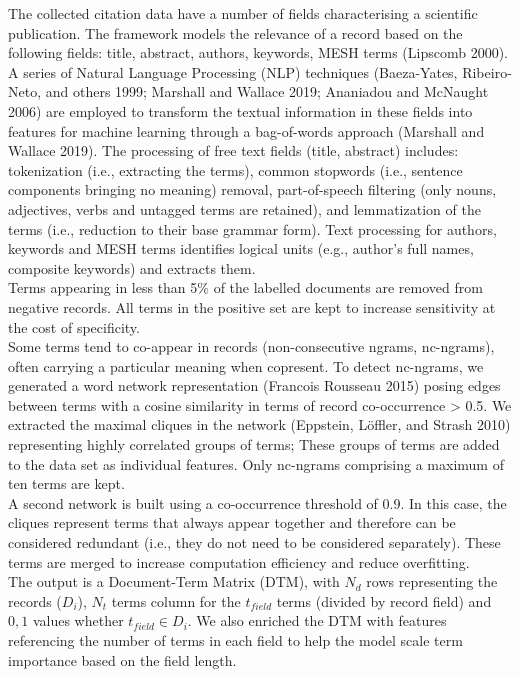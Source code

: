 \documentclass{article}
\begin{document}
The collected citation data have a number of fields characterising a
scientific publication. The framework models the relevance of a record
based on the following fields: title, abstract, authors, keywords, MESH
terms (Lipscomb 2000). A series of Natural Language Processing (NLP)
techniques (Baeza-Yates, Ribeiro-Neto, and others 1999; Marshall and
Wallace 2019; Ananiadou and McNaught 2006) are employed to transform the
textual information in these fields into features for machine learning
through a bag-of-words approach (Marshall and Wallace 2019). The
processing of free text fields (title, abstract) includes: tokenization
(i.e., extracting the terms), common stopwords (i.e., sentence
components bringing no meaning) removal, part-of-speech filtering (only
nouns, adjectives, verbs and untagged terms are retained), and
lemmatization of the terms (i.e., reduction to their base grammar form).
Text processing for authors, keywords and MESH terms identifies logical
units (e.g., author's full names, composite keywords) and extracts
them.\\
Terms appearing in less than 5\% of the labelled documents are removed
from negative records. All terms in the positive set are kept to
increase sensitivity at the cost of specificity.\\
Some terms tend to co-appear in records (non-consecutive ngrams,
nc-ngrams), often carrying a particular meaning when copresent. To
detect nc-ngrams, we generated a word network representation (Francois
Rousseau 2015) posing edges between terms with a cosine similarity in
terms of record co-occurrence \textgreater{} 0.5. We extracted the
maximal cliques in the network (Eppstein, Löffler, and Strash 2010)
representing highly correlated groups of terms; These groups of terms
are added to the data set as individual features. Only nc-ngrams
comprising a maximum of ten terms are kept.\\
A second network is built using a co-occurrence threshold of 0.9. In
this case, the cliques represent terms that always appear together and
therefore can be considered redundant (i.e., they do not need to be
considered separately). These terms are merged to increase computation
efficiency and reduce overfitting.\\
The output is a Document-Term Matrix (DTM), with \(N_d\) rows
representing the records (\(D_i\)), \(N_t\) terms column for the
\(t_{field}\) terms (divided by record field) and \({0,1}\) values
whether \(t_{field} \in D_i\). We also enriched the DTM with features
referencing the number of terms in each field to help the model scale
term importance based on the field length.
\end{document}

